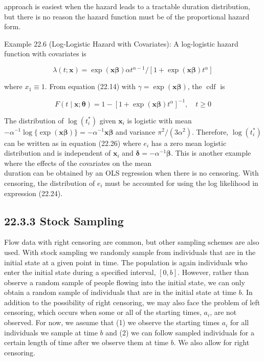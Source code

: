 \documentclass[10pt]{article}
\begin{document}
approach is easiest when the hazard leads to a tractable duration distribution, but there is no reason the hazard function must be of the proportional hazard form.

Example 22.6 (Log-Logistic Hazard with Covariates): A log-logistic hazard function with covariates is


\begin{equation*}
\lambda(t ; \mathbf{x})=\exp (\mathbf{x} \boldsymbol{\beta}) \alpha t^{\alpha-1} /\left[1+\exp (\mathbf{x} \boldsymbol{\beta}) t^{\alpha}\right] \tag{22.27}
\end{equation*}


where $x_{1} \equiv 1$. From equation (22.14) with $\gamma=\exp (\mathbf{x} \boldsymbol{\beta})$, the $\operatorname{cdf}$ is


\begin{equation*}
F(t \mid \mathbf{x} ; \boldsymbol{\theta})=1-\left[1+\exp (\mathbf{x} \boldsymbol{\beta}) t^{\alpha}\right]^{-1}, \quad t \geq 0 \tag{22.28}
\end{equation*}


The distribution of $\log \left(t_{i}^{*}\right)$ given $\mathbf{x}_{i}$ is logistic with mean $-\alpha^{-1} \log \{\exp (\mathbf{x} \boldsymbol{\beta})\}= -\alpha^{-1} \mathbf{x} \boldsymbol{\beta}$ and variance $\pi^{2} /\left(3 \alpha^{2}\right)$. Therefore, $\log \left(t_{i}^{*}\right)$ can be written as in equation (22.26) where $e_{i}$ has a zero mean logistic distribution and is independent of $\mathbf{x}_{i}$ and $\boldsymbol{\delta}=-\alpha^{-1} \boldsymbol{\beta}$. This is another example where the effects of the covariates on the mean\\
duration can be obtained by an OLS regression when there is no censoring. With censoring, the distribution of $e_{i}$ must be accounted for using the log likelihood in expression (22.24).

\subsection*{22.3.3 Stock Sampling}
Flow data with right censoring are common, but other sampling schemes are also used. With stock sampling we randomly sample from individuals that are in the initial state at a given point in time. The population is again individuals who enter the initial state during a specified interval, $[0, b]$. However, rather than observe a random sample of people flowing into the initial state, we can only obtain a random sample of individuals that are in the initial state at time $b$. In addition to the possibility of right censoring, we may also face the problem of left censoring, which occurs when some or all of the starting times, $a_{i}$, are not observed. For now, we assume that (1) we observe the starting times $a_{i}$ for all individuals we sample at time $b$ and (2) we can follow sampled individuals for a certain length of time after we observe them at time $b$. We also allow for right censoring.
\end{document}
